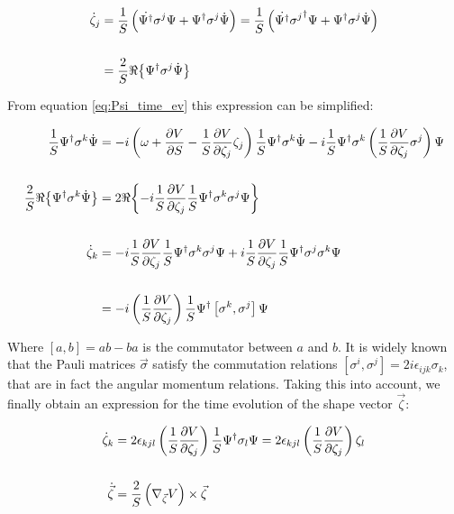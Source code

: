 \begin{align*}
\dot{\zeta}_j &= \frac{1}{S}\left(  \dot{\Psi^{\dagger}}\sigma^j\Psi + \Psi^{\dagger}\sigma^j\dot{\Psi} \right) =
\frac{1}{S}\left(  \dot{\Psi^{\dagger}}{\sigma^j}^{\dagger}\Psi + \Psi^{\dagger}\sigma^j\dot{\Psi} \right)\\
\\
&= \frac{2}{S}\Re{\left\{\Psi^{\dagger}\sigma^j\dot{\Psi}\right\}}
\end{align*}

From equation \eqref{eq:Psi_time_ev} this expression can be simplified:

\begin{align*}
\frac{1}{S}\Psi^{\dagger}\sigma^k\dot{\Psi} &= -i\left( \omega +\frac{\partial V}{\partial S}- \frac{1}{S}\frac{\partial V}{\partial \zeta_j}\zeta_j  \right)\frac{1}{S}\Psi^{\dagger}\sigma^k\dot{\Psi} -i\frac{1}{S}\Psi^{\dagger}\sigma^k\left( \frac{1}{S}\frac{\partial V}{\partial \zeta_j}\sigma^j \right)\Psi\\
\\
\frac{2}{S}\Re{\left\{\Psi^{\dagger}\sigma^k\dot{\Psi}\right\}} &= 2\Re{\left\{-i\frac{1}{S}\frac{\partial V}{\partial \zeta_j}\frac{1}{S}\Psi^{\dagger}\sigma^k\sigma^j\Psi\right\}}\\
\\
\dot{\zeta}_k &= -i\frac{1}{S}\frac{\partial V}{\partial \zeta_j}\frac{1}{S}\Psi^{\dagger}\sigma^k\sigma^j\Psi +i\frac{1}{S}\frac{\partial V}{\partial \zeta_j}\frac{1}{S}\Psi^{\dagger}\sigma^j\sigma^k\Psi\\
\\
&= -i\left( \frac{1}{S}\frac{\partial V}{\partial \zeta_j} \right)\frac{1}{S}\Psi^{\dagger}\left[\sigma^k,\sigma^j\right]\Psi
\end{align*}

Where $[a,b] = ab-ba$ is the commutator between $a$ and $b$. It is widely known that the Pauli matrices $\vec{\sigma}$ satisfy the commutation relations $[\sigma^i,\sigma^j] = 2i\epsilon_{ijk}\sigma_k$, that are in fact  the angular momentum relations. Taking this into account, we finally obtain an expression for the time evolution of the shape vector $\vec{\zeta}$:

\begin{align}
\dot{\zeta}_k &= 2\epsilon_{kjl}\left( \frac{1}{S}\frac{\partial V}{\partial \zeta_j} \right)\frac{1}{S}\Psi^{\dagger}\sigma_l\Psi =  2\epsilon_{kjl}\left( \frac{1}{S}\frac{\partial V}{\partial \zeta_j} \right)\zeta_l \nonumber \\ 
\nonumber \\ 
\dot{\vec{\zeta}} &= \frac{2}{S}\left( \nabla_{\vec{\zeta}}V \right)\times\vec{\zeta} 
\end{align}

